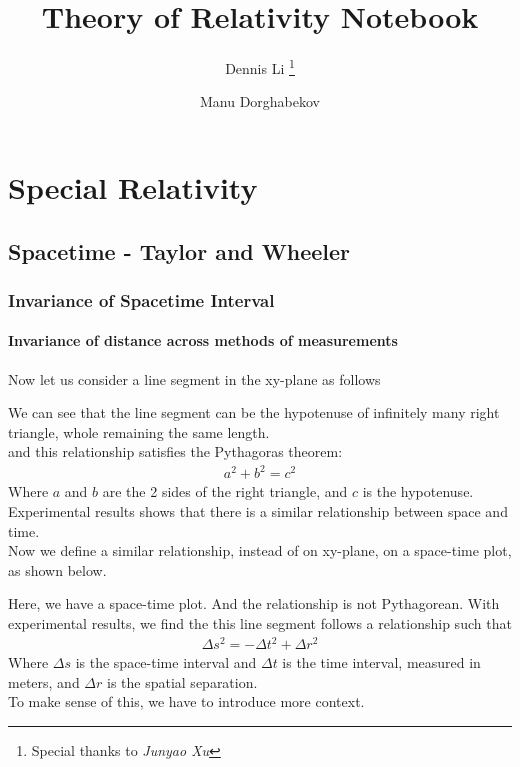 \documentclass[12pt]{book}
\title{\textbf{Theory of Relativity Notebook}}
\author[$\dagger$]{
Dennis Li 
\thanks{Special thanks to \textit{Junyao Xu}}
}
\author[$\dagger$]{
Manu Dorghabekov 
}
\affil[$\dagger$]{Prof. Gabriel Perez-Giz}
\begin{document}
\maketitle
\tableofcontents
\part{Special Relativity}
\chapter{Spacetime - Taylor and Wheeler}
\section{Invariance of Spacetime Interval}

\subsection{Invariance of distance across methods of measurements}

Now let us consider a line segment in the xy-plane as follows
\begin{center}
\end{center}

We can see that the line segment can be the hypotenuse of infinitely many right triangle, whole remaining the same length.\\
and this relationship satisfies the Pythagoras theorem:
\begin{align}
a^2+b^2=c^2
\end{align}
Where $a$ and $b$ are the 2 sides of the right triangle, and $c$ is the hypotenuse.\\
Experimental results shows that there is a similar relationship between space and time.\\
Now we define a similar relationship, instead of on xy-plane, on a space-time plot, as shown below. 
\begin{center}
\end{center}
Here, we have a space-time plot. And the relationship is not Pythagorean. With experimental results, we find the this line segment follows a relationship such that
\begin{align}
\Delta s^2=-\Delta t^2 + \Delta r^2
\end{align}
Where $\Delta s$ is the space-time interval and $\Delta t$ is the time interval, measured in meters, and $\Delta r$ is the spatial separation.\\
To make sense of this, we have to introduce more context.
\end{document}
